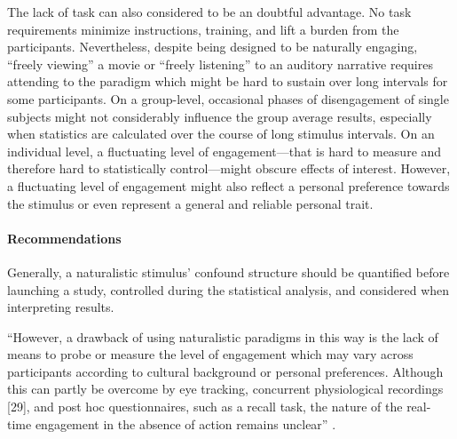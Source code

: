 %
The lack of task can also considered to be an doubtful advantage.
%
No task requirements minimize instructions, training, and lift a burden from the
participants.
%
Nevertheless, despite being designed to be naturally engaging, ``freely
viewing'' a movie or ``freely listening'' to an auditory narrative requires
attending to the paradigm which might be hard to sustain over long intervals for
some participants.
%
On a group-level, occasional phases of disengagement of single subjects might
not considerably influence the group average results, especially when statistics
are calculated over the course of long stimulus intervals.
%
On an individual level, a fluctuating level of engagement---that is hard to
measure and therefore hard to statistically control---might obscure effects of
interest.
%
However, a fluctuating level of engagement might also reflect a personal
preference towards the stimulus or even represent a general and reliable
personal trait.


\paragraph{Recommendations}



%
Generally, a naturalistic stimulus' confound structure should be quantified
before launching a study, controlled during the statistical analysis, and
considered when interpreting results.

``However, a drawback of using naturalistic paradigms in this way is the lack of
means to probe or measure the level of engagement which may vary across
participants according to cultural background or personal preferences.
%
Although this can partly be overcome by eye tracking, concurrent physiological
recordings [29], and post hoc questionnaires, such as a recall task, the nature
of the real-time engagement in the absence of action remains unclear''
\citep{sonkusare2019naturalistic}.

